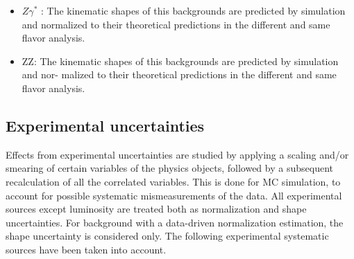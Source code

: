 \begin{itemize}
\item $ Z \gamma^*$  : The kinematic shapes of this backgrounds are predicted by simulation and
normalized to their theoretical predictions in the different and same flavor analysis.

\item ZZ: The kinematic shapes of this backgrounds are predicted by simulation and nor-
malized to their theoretical predictions in the different and same flavor analysis.

\end{itemize}




\subsection*{Experimental uncertainties}
Effects from experimental uncertainties are studied by applying a scaling and/or smearing of
certain variables of the physics objects, followed by a subsequent recalculation of all the correlated variables. This is done for MC simulation, to account for possible systematic mismeasurements of the data. All experimental sources except luminosity are treated both as normalization and shape uncertainties. For background with a data-driven normalization estimation,
the shape uncertainty is considered only. The following experimental systematic sources have
been taken into account.

